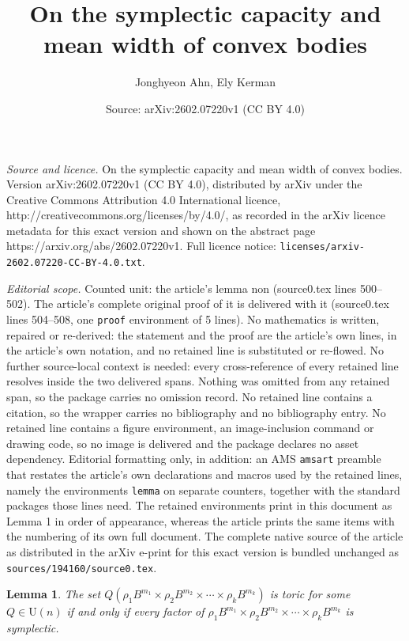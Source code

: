 \documentclass[10pt,a4paper]{amsart}
\title{On the symplectic capacity and mean width of convex bodies}
\author{Jonghyeon Ahn, Ely Kerman}
\date{Source: arXiv:2602.07220v1 (CC BY 4.0)}
\newtheorem{lemma}{Lemma}
\begin{document}
\maketitle

\noindent\emph{Source and licence.} On the symplectic capacity and mean width of convex bodies. Version arXiv:2602.07220v1 (CC BY 4.0), distributed by arXiv under the Creative Commons Attribution 4.0 International licence, http://creativecommons.org/licenses/by/4.0/, as recorded in the arXiv licence metadata for this exact version and shown on the abstract page https://arxiv.org/abs/2602.07220v1. Full licence notice: \texttt{licenses/arxiv-2602.07220-CC-BY-4.0.txt}.\par\smallskip

\noindent\textit{Editorial scope.} Counted unit: the article's lemma non (source0.tex lines 500--502). The article's complete original proof of it is delivered with it (source0.tex lines 504--508, one \texttt{proof} environment of 5 lines). No mathematics is written, repaired or re-derived: the statement and the proof are the article's own lines, in the article's own notation, and no retained line is substituted or re-flowed.  No further source-local context is needed: every cross-reference of every retained line resolves inside the two delivered spans.  Nothing was omitted from any retained span, so the package carries no omission record.  No retained line contains a citation, so the wrapper carries no bibliography and no bibliography entry.  No retained line contains a figure environment, an image-inclusion command or drawing code, so no image is delivered and the package declares no asset dependency.  Editorial formatting only, in addition: an AMS \texttt{amsart} preamble that restates the article's own declarations and macros used by the retained lines, namely the environments \texttt{lemma} on separate counters, together with the standard packages those lines need.  The retained environments print in this document as Lemma 1 in order of appearance, whereas the article prints the same items with the numbering of its own full document.  The complete native source of the article as distributed in the arXiv e-print for this exact version is bundled unchanged as \texttt{sources/194160/source0.tex}.
\begin{lemma}\label{non}
The set $Q(\rho_1B^{m_1} \times \rho_2 B^{m_2} \times \cdots \times \rho_k B^{m_k})$ is toric for some $Q \in \mathrm{U}(n)$ if and only if every factor of $\rho_1B^{m_1} \times \rho_2 B^{m_2} \times \cdots \times \rho_k B^{m_k}$ is symplectic.
\end{lemma}
\end{document}
